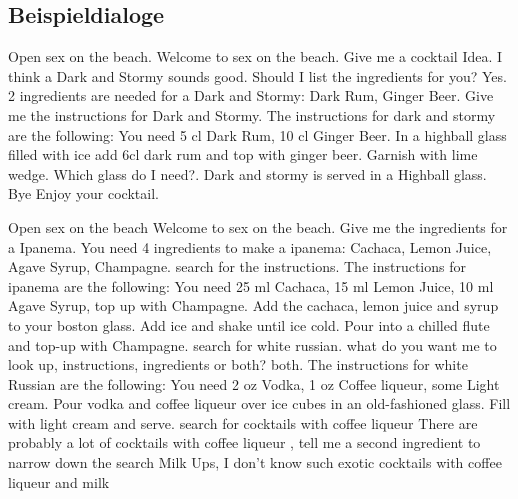 \documentclass[12pt,letterpaper]{article}
\begin{document}
\subsection{Beispieldialoge}
\begin{dialogue}
	 Open sex on the beach.
	 Welcome to sex on the beach.
	 Give me a cocktail Idea.
	 I think a Dark and Stormy sounds good. Should I list the ingredients for you?
	 Yes.
	 2 ingredients are needed for a Dark and Stormy: Dark Rum, Ginger Beer.
	 Give me the instructions for Dark and Stormy.
	 The instructions for dark and stormy are the following: You need 5 cl Dark Rum, 10 cl Ginger Beer. In a highball glass filled with ice add 6cl dark rum and top with ginger beer. Garnish with lime wedge.
	 Which glass do I need?.
	 Dark and stormy is served in a Highball glass.
	 Bye
	 Enjoy your cocktail.
\end{dialogue}

\begin{dialogue}
	 Open sex on the beach
	 Welcome to sex on the beach.
	 Give me the ingredients for a Ipanema.
	 You need 4 ingredients to make a ipanema:
	Cachaca, Lemon Juice, Agave Syrup, Champagne.
	 search for the instructions.
	The instructions for ipanema are the following: You need 25 ml Cachaca, 15 ml Lemon Juice, 10 ml Agave Syrup, top up with Champagne. Add the cachaca, lemon juice and syrup to your boston glass. Add ice and shake until ice cold. Pour into a chilled flute and top-up with Champagne.
	 search for white russian.
	 what do you want me to look up, instructions, ingredients or both?
	 both.
	 The instructions for white Russian are the following: You need 2 oz Vodka, 1 oz Coffee liqueur, some Light cream. Pour vodka and coffee liqueur over ice cubes in an old-fashioned glass. Fill with light cream and serve.
	 search for cocktails with coffee liqueur
	 There are probably a lot of cocktails with coffee liqueur ,
	tell me a second ingredient to narrow down the search
	 Milk
	 Ups, I don't know such exotic cocktails with coffee liqueur and milk
\end{dialogue}
\end{document}
